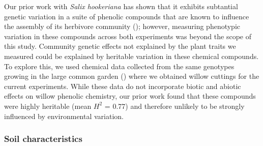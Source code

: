 \documentclass[11pt]{article}
\begin{document}
Our prior work with \emph{Salix hookeriana} has shown that it exhibits subtantial genetic variation in a suite of phenolic compounds that are known to influence the assembly of its herbivore community (\citealt{Barbour_2015}); however, measuring phenotypic variation in these compounds across both experiments was beyond the scope of this study. Community genetic effects not explained by the plant traits we measured could be explained by heritable variation in these chemical compounds. To explore this, we used chemical data collected from the same genotypes growing in the large common garden (\citealt{Barbour_2015}) where we obtained willow cuttings for the current experiments. While these data do not incorporate biotic and abiotic effects on willow phenolic chemistry, our prior work found that these compounds were highly heritable (mean \(H^2\) = 0.77) and therefore unlikely to be strongly influenced by environmental variation.

\subsubsection*{Soil characteristics}
\end{document}
